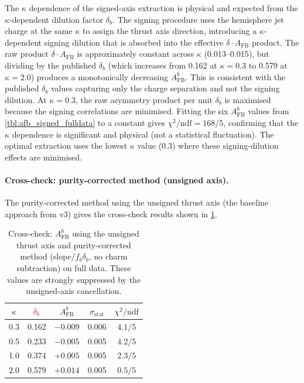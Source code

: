\documentclass[11pt,a4paper]{article}
\newcommand{\external}[1]{\textcolor{red}{#1}}
\begin{document}
The $\kappa$ dependence of the signed-axis extraction is physical
and expected from the $\kappa$-dependent dilution factor $\delta_b$.
The signing procedure uses the hemisphere jet charge at the same
$\kappa$ to assign the thrust axis direction, introducing a
$\kappa$-dependent signing dilution that is absorbed into the
effective $\delta \cdot A_\text{FB}$ product.
The raw product $\delta \cdot A_\text{FB}$ is approximately constant
across $\kappa$ ($0.013$--$0.015$), but dividing by the published
$\delta_b$ (which increases from 0.162 at $\kappa = 0.3$ to
0.579 at $\kappa = 2.0$) produces a monotonically decreasing
$A_\text{FB}^b$.
This is consistent with the published $\delta_b$ values capturing
only the charge separation and not the signing dilution.
At $\kappa = 0.3$, the raw asymmetry product per unit $\delta_b$
is maximised because the signing correlations are minimised.
Fitting the six $A_\text{FB}^b$ values from
\cref{tbl:afb_signed_fulldata} to a constant gives
$\chi^2/\text{ndf} = 168/5$, confirming that the $\kappa$ dependence
is significant and physical (not a statistical fluctuation).
The optimal extraction uses the lowest $\kappa$ value ($0.3$)
where these signing-dilution effects are minimised.

\paragraph{Cross-check: purity-corrected method (unsigned axis).}

The purity-corrected method using the unsigned thrust axis (the
baseline approach from v3) gives the cross-check results shown
in \cref{tbl:afb_unsigned_fulldata}.

\begin{table}[htbp]
\centering
\caption{Cross-check: $A_\text{FB}^b$ using the unsigned thrust
axis and purity-corrected method (slope$/f_b \delta_b$,
no charm subtraction) on full data.
These values are strongly suppressed by the unsigned-axis
cancellation.}
\label{tbl:afb_unsigned_fulldata}
\begin{tabular}{ccccc}
\toprule
$\kappa$ & $\external{\delta_b}$ &
$A_\text{FB}^b$ & $\sigma_\text{stat}$ & $\chi^2/\text{ndf}$ \\
\midrule
0.3 & 0.162 & $-0.009$ & 0.006 & $4.1/5$ \\
0.5 & 0.233 & $-0.005$ & 0.005 & $4.2/5$ \\
1.0 & 0.374 & $+0.005$ & 0.005 & $2.3/5$ \\
2.0 & 0.579 & $+0.014$ & 0.005 & $0.5/5$ \\
\bottomrule
\end{tabular}
\end{table}
\end{document}
